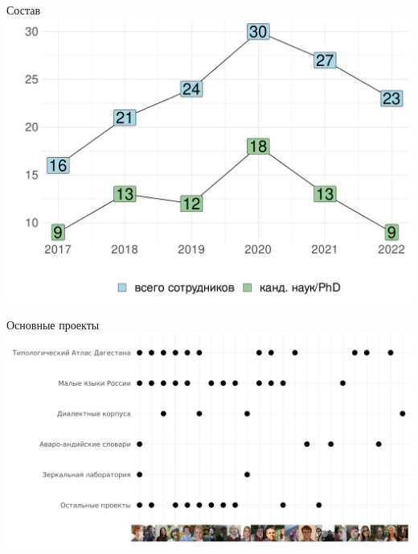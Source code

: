 \documentclass[
  13pt,
  ignorenonframetext,
]{beamer}
\begin{document}
\begin{frame}{Состав}
\protect\hypertarget{ux441ux43eux441ux442ux430ux432}{}
\includegraphics{2023.11.24_moroz_conlab_HSE_experts_files/figure-beamer/unnamed-chunk-3-1.pdf}
\end{frame}

\begin{frame}{Основные проекты}
\protect\hypertarget{ux43eux441ux43dux43eux432ux43dux44bux435-ux43fux440ux43eux435ux43aux442ux44b}{}
\includegraphics[width=1.1\linewidth]{images/03_projects}
\end{frame}
\end{document}
